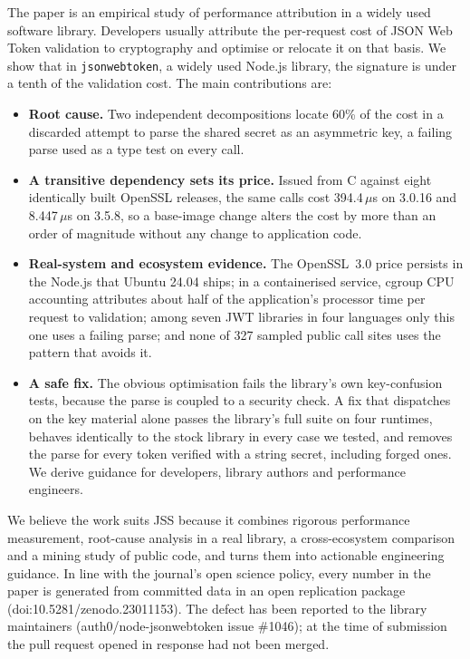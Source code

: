 \documentclass[11pt,a4paper]{article}
\begin{document}
The paper is an empirical study of performance attribution in a widely used
software library. Developers usually attribute the per-request cost of JSON
Web Token validation to cryptography and optimise or relocate it on that
basis. We show that in \texttt{jsonwebtoken}, a widely used Node.js library,
the signature is under a tenth of the validation cost. The main contributions
are:
\begin{itemize}
\item \textbf{Root cause.} Two independent decompositions locate 60\% of the
  cost in a discarded attempt to parse the shared secret as an asymmetric key,
  a failing parse used as a type test on every call.
\item \textbf{A transitive dependency sets its price.} Issued from C against
  eight identically built OpenSSL releases, the same calls cost
  394.4\,$\mu$s on 3.0.16 and 8.447\,$\mu$s on 3.5.8, so a base-image change
  alters the cost by more than an order of magnitude without any change to
  application code.
\item \textbf{Real-system and ecosystem evidence.} The OpenSSL~3.0 price
  persists in the Node.js that Ubuntu 24.04 ships; in a containerised service,
  cgroup CPU accounting attributes about half of the application's processor
  time per request to validation; among seven JWT libraries in four languages
  only this one uses a failing parse; and none of 327 sampled public call sites
  uses the pattern that avoids it.
\item \textbf{A safe fix.} The obvious optimisation fails the library's own
  key-confusion tests, because the parse is coupled to a security check. A fix
  that dispatches on the key material alone passes the library's full suite on
  four runtimes, behaves identically to the stock library in every case we
  tested, and removes the parse for every token verified with a string secret,
  including forged ones. We
  derive guidance for developers, library authors and performance engineers.
\end{itemize}

We believe the work suits JSS because it combines rigorous performance
measurement, root-cause analysis in a real library, a cross-ecosystem
comparison and a mining study of public code, and turns them into actionable
engineering guidance. In line with the journal's open science policy, every
number in the paper is generated from committed data in an open replication
package (doi:10.5281/zenodo.23011153). The defect has been reported to the library maintainers
(auth0/node-jsonwebtoken issue \#1046); at the time of submission the pull
request opened in response had not been merged.
\end{document}
